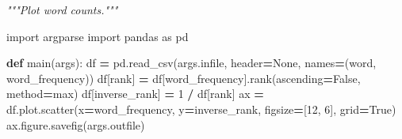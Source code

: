 \documentclass[
]{krantz}
\makeatletter
\newenvironment{Shaded}{\begin{snugshade}}{\end{snugshade}}
\newcommand{\CommentTok}[1]{\textcolor[rgb]{0.56,0.35,0.01}{\textit{#1}}}
\newcommand{\DecValTok}[1]{\textcolor[rgb]{0.00,0.00,0.81}{#1}}
\newcommand{\ImportTok}[1]{#1}
\newcommand{\KeywordTok}[1]{\textcolor[rgb]{0.13,0.29,0.53}{\textbf{#1}}}
\newcommand{\NormalTok}[1]{#1}
\newcommand{\OperatorTok}[1]{\textcolor[rgb]{0.81,0.36,0.00}{\textbf{#1}}}
\newcommand{\StringTok}[1]{\textcolor[rgb]{0.31,0.60,0.02}{#1}}
\newcommand{\VariableTok}[1]{\textcolor[rgb]{0.00,0.00,0.00}{#1}}
\newenvironment{kframe}{%
\medskip{}
\setlength{\fboxsep}{.8em}
 \def\at@end@of@kframe{}%
 \ifinner\ifhmode%
  \def\at@end@of@kframe{\end{minipage}}%
  \begin{minipage}{\columnwidth}%
 \fi\fi%
 \def\FrameCommand##1{\hskip\@totalleftmargin \hskip-\fboxsep
 \colorbox{shadecolor}{##1}\hskip-\fboxsep
     \hskip-\linewidth \hskip-\@totalleftmargin \hskip\columnwidth}%
 \MakeFramed {\advance\hsize-\width
   \@totalleftmargin\z@ \linewidth\hsize
   \@setminipage}}%
 {\par\unskip\endMakeFramed%
 \at@end@of@kframe}
\renewenvironment{Shaded}{\begin{kframe}}{\end{kframe}}
\makeatother
\begin{document}
\begin{Shaded}
\begin{Highlighting}[]
\CommentTok{"""Plot word counts."""}

\ImportTok{import}\NormalTok{ argparse}
\ImportTok{import}\NormalTok{ pandas }\ImportTok{as}\NormalTok{ pd}


\KeywordTok{def}\NormalTok{ main(args):}
\NormalTok{    df }\OperatorTok{=}\NormalTok{ pd.read\_csv(args.infile, header}\OperatorTok{=}\VariableTok{None}\NormalTok{, names}\OperatorTok{=}\NormalTok{(}\StringTok{\textquotesingle{}word\textquotesingle{}}\NormalTok{, }\StringTok{\textquotesingle{}word\_frequency\textquotesingle{}}\NormalTok{))}
\NormalTok{    df[}\StringTok{\textquotesingle{}rank\textquotesingle{}}\NormalTok{] }\OperatorTok{=}\NormalTok{ df[}\StringTok{\textquotesingle{}word\_frequency\textquotesingle{}}\NormalTok{].rank(ascending}\OperatorTok{=}\VariableTok{False}\NormalTok{, method}\OperatorTok{=}\StringTok{\textquotesingle{}max\textquotesingle{}}\NormalTok{)}
\NormalTok{    df[}\StringTok{\textquotesingle{}inverse\_rank\textquotesingle{}}\NormalTok{] }\OperatorTok{=} \DecValTok{1} \OperatorTok{/}\NormalTok{ df[}\StringTok{\textquotesingle{}rank\textquotesingle{}}\NormalTok{]}
\NormalTok{    ax }\OperatorTok{=}\NormalTok{ df.plot.scatter(x}\OperatorTok{=}\StringTok{\textquotesingle{}word\_frequency\textquotesingle{}}\NormalTok{, y}\OperatorTok{=}\StringTok{\textquotesingle{}inverse\_rank\textquotesingle{}}\NormalTok{,}
\NormalTok{                         figsize}\OperatorTok{=}\NormalTok{[}\DecValTok{12}\NormalTok{, }\DecValTok{6}\NormalTok{], grid}\OperatorTok{=}\VariableTok{True}\NormalTok{)}
\NormalTok{    ax.figure.savefig(args.outfile)}



\end{Highlighting}
\end{Shaded}
\end{document}
